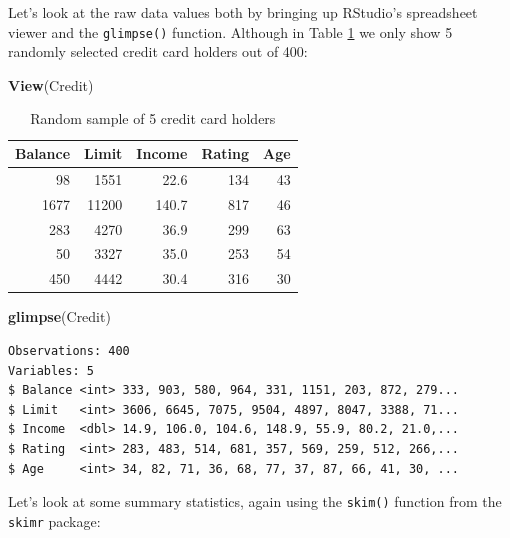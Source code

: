 \documentclass[12pt, krantz2,]{krantz}
\makeatletter
\newenvironment{Shaded}{\begin{snugshade}}{\end{snugshade}}
\newcommand{\KeywordTok}[1]{\textcolor[rgb]{0.27,0.27,0.27}{\textbf{#1}}}
\newcommand{\NormalTok}[1]{#1}
\newcommand{\OperatorTok}[1]{\textcolor[rgb]{0.43,0.43,0.43}{\textbf{#1}}}
\newcommand{\StringTok}[1]{\textcolor[rgb]{0.5,0.5,0.5}{#1}}
\newenvironment{kframe}{%
\medskip{}
\setlength{\fboxsep}{.8em}
 \def\at@end@of@kframe{}%
 \ifinner\ifhmode%
  \def\at@end@of@kframe{\end{minipage}}%
  \begin{minipage}{\columnwidth}%
 \fi\fi%
 \def\FrameCommand##1{\hskip\@totalleftmargin \hskip-\fboxsep
 \colorbox{shadecolor}{##1}\hskip-\fboxsep
     \hskip-\linewidth \hskip-\@totalleftmargin \hskip\columnwidth}%
 \MakeFramed {\advance\hsize-\width
   \@totalleftmargin\z@ \linewidth\hsize
   \@setminipage}}%
 {\par\unskip\endMakeFramed%
 \at@end@of@kframe}
\renewenvironment{Shaded}{\begin{kframe}}{\end{kframe}}
\makeatother
\begin{document}
Let's look at the raw data values both by bringing up RStudio's spreadsheet viewer and the \texttt{glimpse()} function. Although in Table \ref{tab:model3-data-preview} we only show 5 randomly selected credit card holders out of 400:

\begin{Shaded}
\begin{Highlighting}[]
\KeywordTok{View}\NormalTok{(Credit)}
\end{Highlighting}
\end{Shaded}

\begin{table}[H]

\caption{\label{tab:model3-data-preview}Random sample of 5 credit card holders}
\centering
\fontsize{10}{12}\selectfont
\begin{tabular}{rrrrr}
\toprule
Balance & Limit & Income & Rating & Age\\
\midrule
98 & 1551 & 22.6 & 134 & 43\\
1677 & 11200 & 140.7 & 817 & 46\\
283 & 4270 & 36.9 & 299 & 63\\
50 & 3327 & 35.0 & 253 & 54\\
450 & 4442 & 30.4 & 316 & 30\\
\bottomrule
\end{tabular}
\end{table}

\begin{Shaded}
\begin{Highlighting}[]
\KeywordTok{glimpse}\NormalTok{(Credit)}
\end{Highlighting}
\end{Shaded}

\begin{verbatim}
Observations: 400
Variables: 5
$ Balance <int> 333, 903, 580, 964, 331, 1151, 203, 872, 279...
$ Limit   <int> 3606, 6645, 7075, 9504, 4897, 8047, 3388, 71...
$ Income  <dbl> 14.9, 106.0, 104.6, 148.9, 55.9, 80.2, 21.0,...
$ Rating  <int> 283, 483, 514, 681, 357, 569, 259, 512, 266,...
$ Age     <int> 34, 82, 71, 36, 68, 77, 37, 87, 66, 41, 30, ...
\end{verbatim}

Let's look at some summary statistics, again using the \texttt{skim()} function from the \texttt{skimr} package:

\begin{Shaded}
\end{Shaded}
\end{document}

